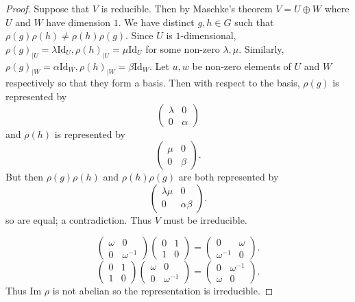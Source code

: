 \documentclass{article}
\begin{document}
\begin{proof}
Suppose that $V$ is reducible. Then by Maschke's theorem $V=U\oplus W$ where $U$ and $W$ have dimension $1$. We have distinct $g,h\in G$ such that $\rho(g)\rho(h)\neq\rho(h)\rho(g)$. Since $U$ is $1$-dimensional, $\rho(g)_{|U}=\lambda\text{Id}_U,\rho(h)_{|U}=\mu\text{Id}_U$ for some non-zero $\lambda,\mu$. Similarly, $\rho(g)_{|W}=\alpha\text{Id}_W,\rho(h)_{|W}=\beta\text{Id}_W$. Let $u,w$ be non-zero elements of $U$ and $W$ respectively so that they form a basis. Then with respect to the basis, $\rho(g)$ is represented by \[\begin{pmatrix}
\lambda & 0 \\
0 & \alpha
\end{pmatrix}\] and $\rho(h)$ is represented by\[\begin{pmatrix}
\mu & 0 \\
0 & \beta
\end{pmatrix}.\] But then $\rho(g)\rho(h)$ and $\rho(h)\rho(g)$ are both represented by \[\begin{pmatrix}
\lambda\mu & 0 \\
0 & \alpha\beta
\end{pmatrix}.\] so are equal; a contradiction. Thus $V$ must be irreducible.


\[\begin{pmatrix}
\omega & 0 \\
0 & \omega^{-1}
\end{pmatrix}\begin{pmatrix}
0 & 1 \\
1 & 0
\end{pmatrix}=
\begin{pmatrix}
0 & \omega \\
\omega^{-1} & 0
\end{pmatrix}.\]
\[
\begin{pmatrix}
0 & 1 \\
1 & 0
\end{pmatrix}\begin{pmatrix}
\omega & 0 \\
0 & \omega^{-1}
\end{pmatrix}=
\begin{pmatrix}
0 & \omega^{-1} \\
\omega & 0
\end{pmatrix}.
\]
Thus $\text{Im }\rho$ is not abelian so the representation is irreducible.
\end{proof}
\end{document}
